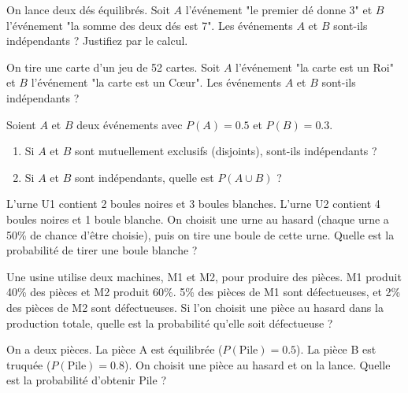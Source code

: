 \begin{exercicebox}
On lance deux dés équilibrés.
Soit $A$ l'événement "le premier dé donne 3" et $B$ l'événement "la somme des deux dés est 7".
Les événements $A$ et $B$ sont-ils indépendants ? Justifiez par le calcul.
\end{exercicebox}

\begin{exercicebox}
On tire une carte d'un jeu de 52 cartes.
Soit $A$ l'événement "la carte est un Roi" et $B$ l'événement "la carte est un Cœur".
Les événements $A$ et $B$ sont-ils indépendants ?
\end{exercicebox}

\begin{exercicebox}
Soient $A$ et $B$ deux événements avec $P(A)=0.5$ et $P(B)=0.3$.
\begin{enumerate}
    \item Si $A$ et $B$ sont mutuellement exclusifs (disjoints), sont-ils indépendants ?
    \item Si $A$ et $B$ sont indépendants, quelle est $P(A \cup B)$ ?
\end{enumerate}
\end{exercicebox}


\begin{exercicebox}
L'urne U1 contient 2 boules noires et 3 boules blanches. L'urne U2 contient 4 boules noires et 1 boule blanche.
On choisit une urne au hasard (chaque urne a 50\% de chance d'être choisie), puis on tire une boule de cette urne.
Quelle est la probabilité de tirer une boule blanche ?
\end{exercicebox}

\begin{exercicebox}
Une usine utilise deux machines, M1 et M2, pour produire des pièces. M1 produit 40\% des pièces et M2 produit 60\%. 5\% des pièces de M1 sont défectueuses, et 2\% des pièces de M2 sont défectueuses.
Si l'on choisit une pièce au hasard dans la production totale, quelle est la probabilité qu'elle soit défectueuse ?
\end{exercicebox}

\begin{exercicebox}
On a deux pièces. La pièce A est équilibrée ($P(\text{Pile})=0.5$). La pièce B est truquée ($P(\text{Pile})=0.8$).
On choisit une pièce au hasard et on la lance. Quelle est la probabilité d'obtenir Pile ?
\end{exercicebox}

